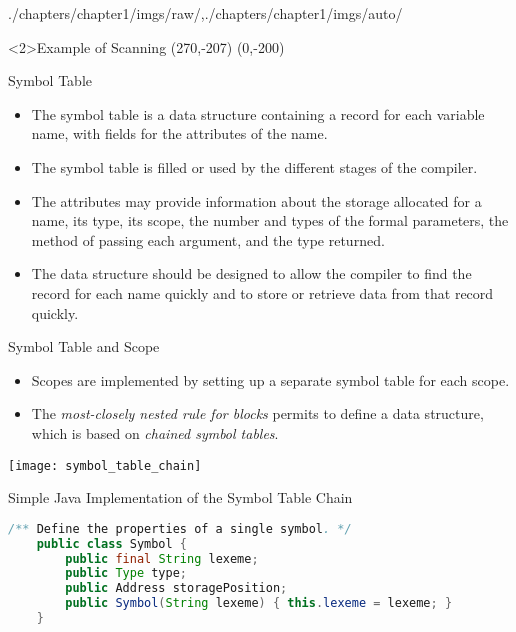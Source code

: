 \begin{graphicspathcontext}{{./chapters/chapter1/imgs/raw/},{./chapters/chapter1/imgs/auto/}}
\begin{bibunit}[apalike]
\begin{frame}<2>{Example of Scanning}
	\putat(270,-207){}
	\putat(0,-200){}
\end{frame}

\begin{frame}{Symbol Table}
	\begin{itemize}
	\item The symbol table is a data structure containing a record for each variable name, with fields for the attributes of the name.
	\vfill
	\item The symbol table is filled or used by the different stages of the compiler.
	\vfill
	\item The attributes may provide information about the storage allocated for a name, its type, its scope, the number and types of the formal parameters, the method of passing each argument, and the type returned.
	\vfill
	\item The data structure should be designed to allow the compiler to find the record for each name quickly and to store or retrieve data from that record quickly.
	\end{itemize}
\end{frame}

\begin{frame}{Symbol Table and Scope}
	\begin{itemize}
	\item Scopes are implemented by setting up a separate symbol table for each scope.
	\item The \emph{most-closely nested rule for blocks} permits to define a data structure, which is based on \emph{chained symbol tables}.
	\end{itemize}
	\vspace{2em}
	\begin{center}
		\texttt{[image: symbol\_table\_chain]}
	\end{center}
\end{frame}

\begin{frame}[fragile]{Simple Java Implementation of the Symbol Table Chain}
	\begin{lstlisting}[language=Java]
	/** Define the properties of a single symbol. */
	public class Symbol {
	    public final String lexeme;
	    public Type type;
	    public Address storagePosition;
	    public Symbol(String lexeme) { this.lexeme = lexeme; }
	}


\end{lstlisting}
\end{frame}
\end{bibunit}
\end{graphicspathcontext}
